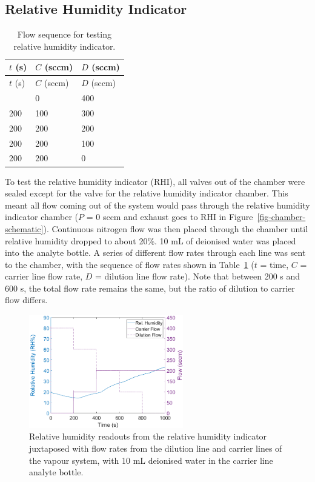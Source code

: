 \documentclass[
  a4paper,
]{scrbook}
\begin{document}
\hypertarget{relative-humidity-indicator}{%
\subsection{Relative Humidity
Indicator}\label{relative-humidity-indicator}}

\hypertarget{tbl-RHI-flow-sequence}{}
\begin{longtable}[]{@{}lll@{}}
\caption{\label{tbl-RHI-flow-sequence}Flow sequence for testing relative
humidity indicator.}\tabularnewline
\toprule\noalign{}
\(t\) (s) & \(C\) (sccm) & \(D\) (sccm) \\
\midrule\noalign{}
\endfirsthead
\toprule\noalign{}
\(t\) (s) & \(C\) (sccm) & \(D\) (sccm) \\
\midrule\noalign{}
\endhead
\bottomrule\noalign{}
\endlastfoot
200 & 0 & 400 \\
200 & 100 & 300 \\
200 & 200 & 200 \\
200 & 200 & 100 \\
200 & 200 & 0 \\
\end{longtable}

To test the relative humidity indicator (RHI), all valves out of the
chamber were sealed except for the valve for the relative humidity
indicator chamber. This meant all flow coming out of the system would
pass through the relative humidity indicator chamber (\(P\) = 0 sccm and
exhaust goes to RHI in Figure~\ref{fig-chamber-schematic}). Continuous
nitrogen flow was then placed through the chamber until relative
humidity dropped to about 20\%. 10 mL of deionised water was placed into
the analyte bottle. A series of different flow rates through each line
was sent to the chamber, with the sequence of flow rates shown in
Table~\ref{tbl-RHI-flow-sequence} (\(t\) = time, \(C\) = carrier line
flow rate, \(D\) = dilution line flow rate). Note that between 200 s and
600 s, the total flow rate remains the same, but the ratio of dilution
to carrier flow differs.

\begin{figure}

{\centering \includegraphics[width=0.6\textwidth,height=\textheight]{figures/ch9/RHI_verification.png}

}

\caption{\label{fig-RHI-verification}Relative humidity readouts from the
relative humidity indicator juxtaposed with flow rates from the dilution
line and carrier lines of the vapour system, with 10 mL deionised water
in the carrier line analyte bottle.}

\end{figure}
\end{document}

